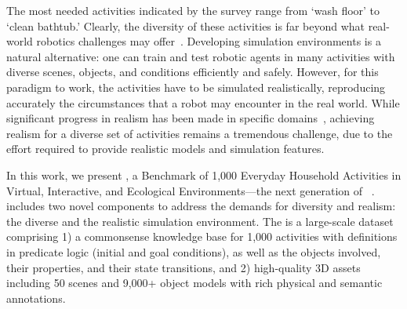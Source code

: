 The most needed activities indicated by the survey range from `wash floor' to `clean bathtub.' Clearly, the diversity of these activities is far beyond what real-world robotics challenges may offer~\cite{kitano1997robocup,wisspeintner2009robocup,iocchi2015robocup,buehler2009darpa,krotkov2017darpa,correll2016analysis,eppner2017lessons,roa2021mobile}. %
Developing simulation environments is a natural alternative: one can train and test robotic agents in many activities with diverse scenes, objects, and conditions efficiently and safely. %
However, for this paradigm to work, the activities have to be simulated realistically, reproducing accurately the circumstances that a robot may encounter in the real world. %
While significant progress in realism has been made in specific domains~\cite{heiden2021disect,urakami2019doorgym,lin2020softgym}, achieving realism for a diverse set of activities remains a tremendous challenge, due to the effort required to provide realistic models and simulation features. %





In this work, we present \textbf{\benchmark}, a Benchmark of 1,000 Everyday Household Activities in Virtual, Interactive, and Ecological Environments---the next generation of \oldbenchmark~\cite{srivastava2021behavior}. 
\benchmark includes two novel components to address the demands for diversity and realism: the diverse \textbf{\dataset} and the realistic \textbf{\simulator} simulation environment. The \dataset is a large-scale dataset comprising 1) a commonsense knowledge base for 1,000 activities with definitions in predicate logic (initial and goal conditions), as well as the objects involved, their properties, and their state transitions, and 2) high-quality 3D assets including 50 scenes and 9,000+ object models with rich physical and semantic annotations. 

